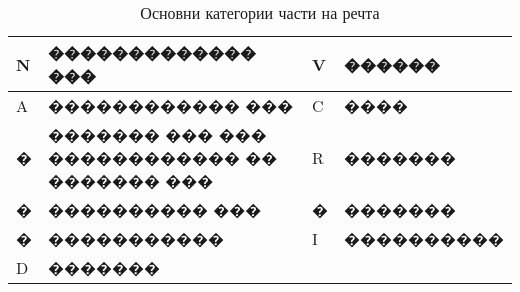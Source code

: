 \begin{table}[!htb] 
  \begin{tabular}{|l|l|l|l|}
\hline 
\hline 
N &	������������� ��� &	V &	 ������\\ 
\hline 
A &	������������ ��� &	C &	 ����\\ 
\hline 
� &	������� ��� ��� ������������ �� ������� ��� &	R &	 �������\\ 
\hline 
� &	���������� ��� &	� &	 �������\\ 
\hline 
� &	����������� &	I &	 ���������� \\ 
\hline 
D &	 �������\\ 
\hline 
 \end{tabular}
 \label{tab:mainpostags}
\caption{Основни категории части на речта}
 \end{table}